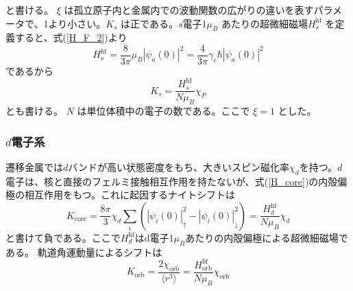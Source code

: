 \documentclass[11pt,a4j]{jreport}
\begin{document}
と書ける。 $\xi$ は孤立原子内と金属内での波動関数の広がりの違いを表すパラメータで、1より小さい。$K_s$ は正である。$s$電子1$\mu_B$ あたりの超微細磁場$H_{s}^{\text{hf}}$ を定義すると、式(\ref{H_F_2})より
\begin{equation}
  H_{s}^{\text{hf}} = \frac{8}{3 \pi} \mu_B |\psi_a(0)|^2 = \frac{4}{3 \pi} \gamma_e \hbar |\psi_a(0)|^2
\end{equation}
であるから
\begin{equation}
  K_s = \frac{H_{s}^{\text{hf}}}{N \mu_B} \chi_P
  \label{K_s_2}
\end{equation}
とも書ける。 \(N\) は単位体積中の電子の数である。ここで \(\xi = 1\) とした。

\subsubsection{$d$電子系}
遷移金属では$d$バンドが高い状態密度をもち、大きいスピン磁化率$\chi_d$を持つ。$d$電子は、核と直接のフェルミ接触相互作用を持たないが、式(\ref{H_core})の内殻偏極の相互作用をもつ。これに起因するナイトシフトは
\begin{equation}
  K_{\text{core}} = \frac{8\pi}{3} \chi_d \sum_i \left( |\psi_i(0)|^2_{\uparrow} - |\psi_i(0)|^2_{\downarrow} \right) = \frac{H_d^{\text{hf}}}{N\mu_B} \chi_d
  \label{K_core}
\end{equation}
と書けて負である。ここで$H_d^{\text{hf}}$はd電子1$\mu_B$あたりの内殻偏極による超微細磁場である。
軌道角運動量によるシフトは
\begin{equation}
  K_{\text{orb}} = \frac{2 \chi_{\text{orb}}}{\langle r^3 \rangle} = \frac{H_{\text{orb}}^{\text{hf}}}{N \mu_B} \chi_{\text{orb}}
  \label{K_orb}
\end{equation}
\end{document}
